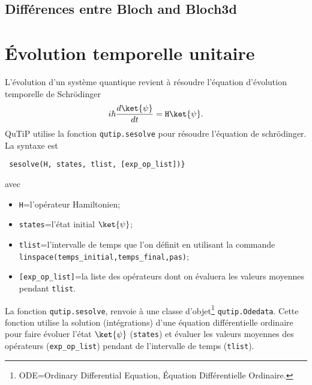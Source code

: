 \subsection{Différences entre Bloch and Bloch3d}

\section{Évolution temporelle unitaire}

L'évolution d'un système quantique revient à résoudre l'équation d'évolution 
temporelle de Schr\"odinger
\begin{equation}
i\hbar\dfrac{d\ket{\psi}}{dt}=\texttt{H}\ket{\psi}.
\end{equation}
QuTiP utilise la fonction \texttt{qutip.sesolve} pour résoudre l'équation de 
schr\"odinger. La syntaxe est\\
\begin{lstlisting}
 sesolve(H, states, tlist, [exp_op_list])}
\end{lstlisting}
avec
\begin{itemize}
\item \texttt{H}=l'opérateur Hamiltonien;
\item \texttt{states}=l'état initial $\ket{\psi}$;
\item \texttt{tlist}=l'intervalle de temps que l'on définit en utilisant la
commande \texttt{linspace(temps\_initial,temps\_final,pas)};
\item \texttt{[exp\_op\_list]}=la liste des opérateurs dont on évaluera les 
valeurs moyennes pendant \texttt{tlist}.
\end{itemize}

La fonction \texttt{qutip.sesolve}, renvoie à une classe 
d'objet\footnote{ODE=Ordinary Differential Equation, Équation Différentielle 
Ordinaire.} \texttt{qutip.Odedata}. Cette fonction utilise la solution 
(intégrations) d'une équation différentielle ordinaire pour faire évoluer 
l'état $\ket{\psi}$ (\texttt{states}) et évaluer les valeurs moyennes 
des opérateurs (\texttt{exp\_op\_list}) pendant de l'intervalle de temps 
(\texttt{tlist}).

